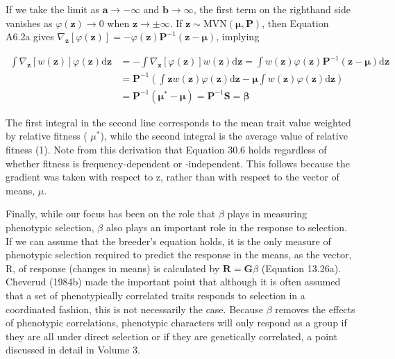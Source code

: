 \documentclass{article}
\begin{document}
If we take the limit as $\mathbf{a} \to -\infty$ and $\mathbf{b} \to \infty$, the first term on the righthand side vanishes as $\varphi(\mathbf{z}) \to 0$ when $\mathbf{z} \to \pm \infty$. If $\mathbf{z} \sim \mathrm{MVN}(\boldsymbol{\mu}, \mathbf{P})$, then Equation A6.2a gives $\nabla_{\mathbf{z}}[\varphi(\mathbf{z})] = -\varphi(\mathbf{z}) \mathbf{P}^{-1}(\mathbf{z} - \boldsymbol{\mu})$, implying

\begin{equation}
\begin{aligned}\int\nabla_{\mathbf{z}}[w(\mathbf{z})]\varphi(\mathbf{z})\mathrm{d}\mathbf{z}&=-\int\nabla_{\mathbf{z}}[\varphi(\mathbf{z})]w(\mathbf{z})\mathrm{d}\mathbf{z}=\int w(\mathbf{z})\varphi(\mathbf{z})\mathbf{P}^{-1}(\mathbf{z}-\boldsymbol{\mu})\mathrm{d}\mathbf{z}\\&=\mathbf{P}^{-1}\left(\int\mathbf{z}w(\mathbf{z})\varphi(\mathbf{z})\mathrm{d}\mathbf{z}-\boldsymbol{\mu}\int w(\mathbf{z})\varphi(\mathbf{z})\mathrm{d}\mathbf{z}\right)\\&=\mathbf{P}^{-1}\left(\boldsymbol{\mu}^{*}-\boldsymbol{\mu}\right)=\mathbf{P}^{-1}\mathbf{S}=\boldsymbol{\beta}\end{aligned}
\end{equation}

The first integral in the second line corresponds to the mean trait value weighted by relative fitness ( $ \mu^{*} $), while the second integral is the average value of relative fitness (1). Note from this derivation that Equation 30.6 holds regardless of whether fitness is frequency-dependent or -independent. This follows because the gradient was taken with respect to z, rather than with respect to the vector of means,  $ \mu $.

Finally, while our focus has been on the role that  $ \beta $ plays in measuring phenotypic selection,  $ \beta $ also plays an important role in the response to selection. If we can assume that the breeder's equation holds, it is the only measure of phenotypic selection required to predict the response in the means, as the vector, R, of response (changes in means) is calculated by  $ \mathbf{R} = \mathbf{G}\beta $ (Equation 13.26a). Cheverud (1984b) made the important point that although it is often assumed that a set of phenotypically correlated traits responds to selection in a coordinated fashion, this is not necessarily the case. Because  $ \beta $ removes the effects of phenotypic correlations, phenotypic characters will only respond as a group if they are all under direct selection or if they are genetically correlated, a point discussed in detail in Volume 3.
\end{document}
